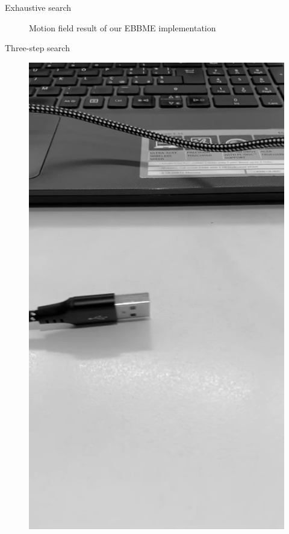 \documentclass[aspectratio=1610,xcolor=dvipsnames]{beamer}
\begin{document}
\begin{frame}{Exhaustive search}
\begin{figure}
\begin{minipage}{.45\textwidth}
            \label{fig:bbme-0-res}
		\end{minipage}
        \label{fig:bbme-0}
        \caption{Motion field result of our EBBME implementation}
	\end{figure}
\end{frame}

\begin{frame}{Three-step search}
	\begin{figure}[H]
		\begin{minipage}{.45\textwidth}
            \centering
            \includegraphics[keepaspectratio, width=.55\linewidth]{images/bbme-im.png}
            \label{fig:bbme-1-im}
		\end{minipage}
		\begin{minipage}{.45\textwidth}
            \centering

\end{minipage}
\end{figure}
\end{frame}
\end{document}
